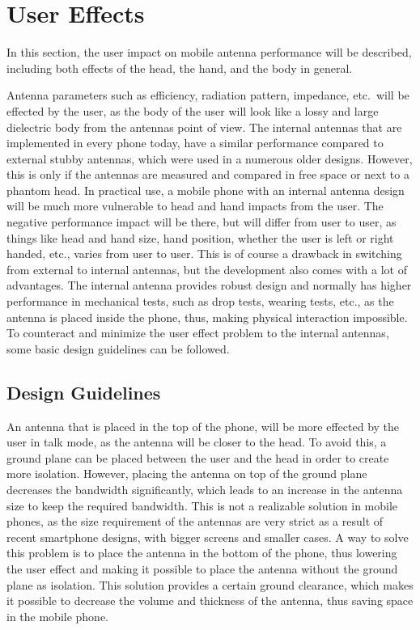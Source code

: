 \section{User Effects}
\label{se:user_effects}
In this section, the user impact on mobile antenna performance will be described, including both effects of the head, the hand, and the body in general.

Antenna parameters such as efficiency, radiation pattern, impedance, etc.\ will be effected by the user, as the body of the user will look like a lossy and large dielectric body from the antennas point of view. 
The internal antennas that are implemented in every phone today, have a similar performance compared to external stubby antennas, which were used in a numerous older designs. However, this is only if the antennas are measured and compared in free space or next to a phantom head. In practical use, a mobile phone with an internal antenna design will be much more vulnerable to head and hand impacts from the user. 
The negative performance impact will be there, but will differ from user to user, as things like head and hand size, hand position, whether the user is left or right handed, etc., varies from user to user. This is of course a drawback in switching from external to internal antennas, but the development also comes with a lot of advantages. The internal antenna provides robust design and normally has higher performance in mechanical tests, such as drop tests, wearing tests, etc., as the antenna is placed inside the phone, thus, making physical interaction impossible. 
To counteract and minimize the user effect problem to the internal antennas, some basic design guidelines can be followed.

\subsection{Design Guidelines}
An antenna that is placed in the top of the phone, will be more effected by the user in talk mode, as the antenna will be closer to the head. To avoid this, a ground plane can be placed between the user and the head in order to create more isolation. However, placing the antenna on top of the ground plane decreases the bandwidth significantly, which leads to an increase in the antenna size to keep the required bandwidth. This is not a realizable solution in mobile phones, as the size requirement of the antennas are very strict as a result of recent smartphone designs, with bigger screens and smaller cases. A way to solve this problem is to place the antenna in the bottom of the phone, thus lowering the user effect and making it possible to place the antenna without the ground plane as isolation. This solution provides a certain ground clearance, which makes it possible to decrease the volume and thickness of the antenna, thus saving space in the mobile phone. 

